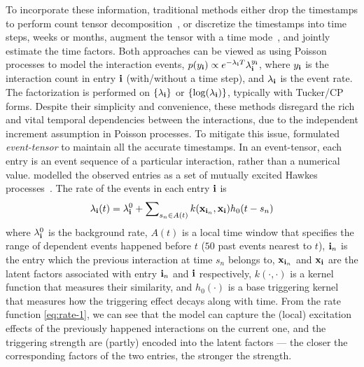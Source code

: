 To incorporate these information, traditional methods either  drop the timestamps  to perform count tensor decomposition~\citep{chi2012tensors, Hu2015CountTensor}, or  discretize the timestamps into time steps, \eg weeks or months,  augment the tensor with a time mode~\citep{xiong2010temporal, schein2015bayesian, Schein:2016:BPT:3045390.3045686}, and jointly estimate the time factors. Both approaches can be viewed as using Poisson processes to model the interaction events, $p(y_{\bf i}) \propto e^{-\lambda_{{\bf i}}T}\lambda_{{\bf i}}^{y_{\bf i}}$,  where $y_{\bf i}$ is the interaction count in entry ${\bf i}$ (with/without a time step), and $\lambda_{{\bf i}}$ is the event rate.  The factorization is performed on $\{\lambda_{{\bf i}}\}$ or $\{\log(\lambda_{{\bf i}})\}$, typically with Tucker/CP forms. 
Despite their simplicity and convenience, these methods disregard the rich and vital temporal dependencies between the interactions, due to the independent increment assumption in Poisson processes.  To mitigate this issue, \citet{zhe2018stochastic} formulated \textit{event-tensor} to maintain all the accurate timestamps. In an event-tensor, each entry is an event sequence of a particular interaction, rather than a numerical value. \citet{zhe2018stochastic} modelled the observed entries as a set of mutually excited Hawkes processes~\citep{hawkes1971spectra}. The rate of the events in each entry  ${\bf i}$ is
\begin{align}
\lambda_{\bf i}(t) = \lambda_{\bf i}^0 + \sum\nolimits_{s_n \in A(t)} k({\bf x}_{{\bf i}_n},{\bf x}_{{\bf i}})h_0(t-s_n) \label{eq:rate-1}
\end{align}
where $\lambda_{\bf i}^0$ is the background rate, $A(t)$ is a local time window that specifies the range of dependent events happened before $t$ (\eg  $50$ past events nearest to $t$), ${\bf i}_n$ is the entry which the previous interaction at time $s_n$ belongs to, ${\bf x}_{{\bf i}_n}$ and ${\bf x}_{{\bf i}}$ are the latent factors associated with entry ${\bf i}_n$ and ${\bf i}$ respectively, $k(\cdot, \cdot)$ is a kernel function that measures their similarity, and $h_0(\cdot)$ is a base triggering kernel that measures how the triggering effect decays along with time. From the rate function \eqref{eq:rate-1}, we can see that the model can capture the (local) excitation effects of the previously happened interactions on the current one, and the triggering strength are (partly) encoded into the latent factors --- the closer the corresponding factors of the two entries, the stronger the strength. 


